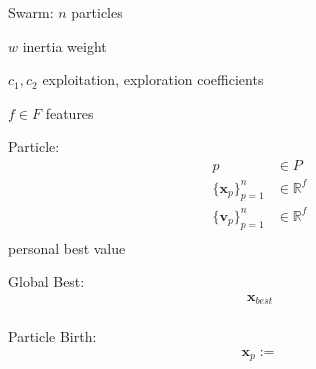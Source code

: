 \documentclass{minimal}
\begin{document}
	
	
	\clearpage
	Swarm:
	\(n\) particles
	
	\(w\) inertia weight
	
	\(c_1,c_2\) exploitation, exploration coefficients
	
	\(f\in F\) features
	
	Particle:
	\begin{align*}
		p &\in P \\
		\{\mathbf{x}_p\}_{p=1}^n &\in \mathbb{R}^f \\
		\{\mathbf{v}_p\}_{p=1}^n &\in \mathbb{R}^f \\
	\end{align*}
	personal best
	value
	
	
	Global Best:
	\begin{align*}
		\mathbf{x}_{best} \\
	\end{align*}
	
	Particle Birth:
	\begin{align*}
		\mathbf{x}_p := 
	\end{align*}
	 
	
\end{document}
